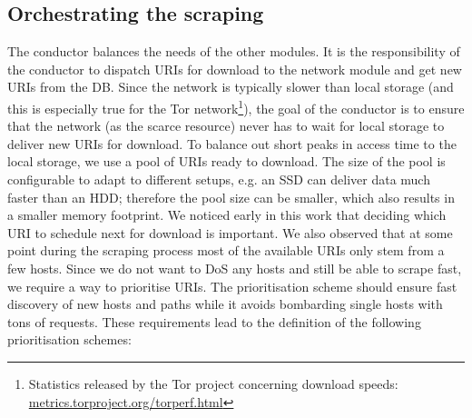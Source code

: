 \documentclass[USenglish,oneside,twocolumn]{article}
\begin{document}
\subsection{Orchestrating the scraping}
The conductor balances the needs of the other modules. It is the responsibility of the conductor to dispatch URIs for download to the network module and get new URIs from the DB. Since the network is typically slower than local storage (and this is especially true for the Tor network\footnote{Statistics released by the Tor project concerning download speeds: \href{https://metrics.torproject.org/torperf.html?source=all&server=onion&filesize=50kb}{metrics.torproject.org/torperf.html}}), the goal of the conductor is to ensure that the network (as the scarce resource) never has to wait for local storage to deliver new URIs for download. To balance out short peaks in access time to the local storage, we use a pool of URIs ready to download. The size of the pool is configurable to adapt to different setups, e.g. an SSD can deliver data much faster than an HDD; therefore the pool size can be smaller, which also results in a smaller memory footprint.
We noticed early in this work that deciding which URI to schedule next for download is important. We also observed  that at some point during the scraping process most of the available URIs only stem from a few hosts. Since we do not want to DoS any hosts and still be able to scrape fast, we require a way to prioritise URIs. The prioritisation scheme should ensure fast discovery of new hosts and paths while it avoids bombarding single hosts with tons of requests. These requirements lead to the definition of the following prioritisation schemes:
\end{document}
